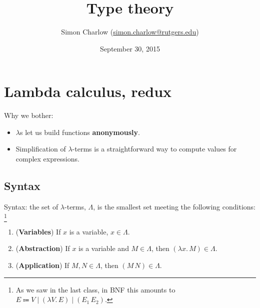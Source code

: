 \documentclass{article}
\author{%
  Simon Charlow
  (\href{mailto:simon.charlow@rutgers.edu}%
  {{simon.charlow@rutgers.edu}})
}
\title{\textbf{Type theory}}
\date{September 30, 2015}
\begin{document}
\maketitle

\section{Lambda calculus, redux}

Why we bother:
\begin{itemize}
  \item
    $\lambda$s let us build functions \textbf{anonymously}.

  \item
    Simplification of $\lambda$-terms is a straightforward way to compute values
    for complex expressions.
\end{itemize}

\subsection{Syntax}

Syntax: the set of $\lambda$-terms, $\Lambda$, is the smallest set meeting the
following conditions:%
\footnote{%
  As we saw in the last class, in BNF this amounts to $E \Coloneqq V \mid
  (\lambda V.\,E) \mid (E_1 \, E_2)$.
}
\begin{enumerate}
  \item
    (\textbf{Variables})
    If $x$ is a variable, $x \in \Lambda$.

  \item
    (\textbf{Abstraction})
    If $x$ is a variable and $M \in \Lambda$, then $(\lambda x.\,M) \in
    \Lambda$.

  \item
    (\textbf{Application})
    If $M,N \in \Lambda$, then $(M\,N) \in \Lambda$.
\end{enumerate}
\end{document}
